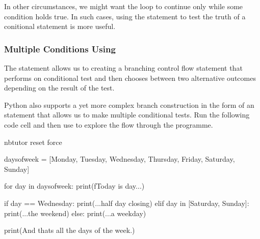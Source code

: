 \documentclass[letterpaper,10pt,english]{sphinxmanual}
\begin{document}
{In other circumstances, we might want the loop to continue only while some condition holds true. In such cases, using the  statement to test the truth of a conitional statement is more useful.


\subsubsection{Multiple Conditions Using }
\label{\detokenize{content/02_Robot_Lab/Section_00_02:Multiple-Conditions-Using-if..elif..else..}}
The  statement allows us to creating a branching control flow statement that performs on conditional test and then chooses between two alternative outcomes depending on the result of the test.

Python also supports a yet more complex branch construction in the form of an  statement that allows us to make multiple conditional tests. Run the following code cell and then use  to explore the flow through the programme.

{
\begin{sphinxVerbatim}[commandchars=\\\{\}]
\llap{\color{nbsphinxin}[ ]:\,\hspace{\fboxrule}\hspace{\fboxsep}}\PYGZpc{}\PYGZpc{}nbtutor \PYGZhy{}\PYGZhy{}reset \PYGZhy{}\PYGZhy{}force

days\PYGZus{}of\PYGZus{}week = [\PYGZsq{}Monday\PYGZsq{}, \PYGZsq{}Tuesday\PYGZsq{}, \PYGZsq{}Wednesday\PYGZsq{}, \PYGZsq{}Thursday\PYGZsq{},
                \PYGZsq{}Friday\PYGZsq{}, \PYGZsq{}Saturday\PYGZsq{}, \PYGZsq{}Sunday\PYGZsq{}]

for day in days\PYGZus{}of\PYGZus{}week:
    print(f\PYGZsq{}Today is \PYGZob{}day\PYGZcb{}...\PYGZsq{})

    if day == \PYGZsq{}Wednesday\PYGZsq{}:
        print(\PYGZsq{}...half day closing\PYGZsq{})
    elif day in [\PYGZsq{}Saturday\PYGZsq{}, \PYGZsq{}Sunday\PYGZsq{}]:
        print(\PYGZsq{}...the weekend\PYGZsq{})
    else:
        print(\PYGZsq{}...a weekday\PYGZsq{})

print(\PYGZdq{}And that\PYGZsq{}s all the days of the week.\PYGZdq{}\PYGZdq{})
\end{sphinxVerbatim}
}

}
\end{document}
